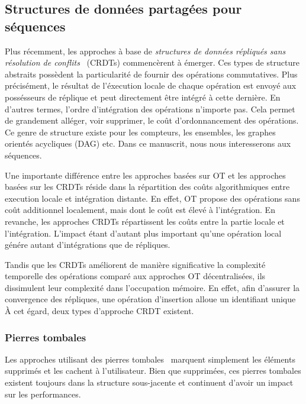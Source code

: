 \subsection{Structures de données partagées pour séquences}

Plus récemment, les approches à base de \emph{structures de données répliqués
  sans résolution de conflits}~\cite{shapiro2011comprehensive,
  shapiro2011conflict} (CRDTs) commencèrent à émerger. Ces types de structure
abstraits possèdent la particularité de fournir des opérations commutatives.
Plus précisément, le résultat de l'éxecution locale de chaque opération est
envoyé aux possésseurs de réplique et peut directement être intégré à cette
dernière.  En d'autres termes, l'ordre d'intégration des opérations n'importe
pas. Cela permet de grandement alléger, voir supprimer, le coût d'ordonnancement
des opérations. Ce genre de structure existe pour les compteurs, les ensembles,
les graphes orientés acycliques (DAG) etc. Dans ce manuscrit, nous nous
interesserons aux séquences.

Une importante différence entre les approches basées sur OT et les approches
basées sur les CRDTs réside dans la répartition des coûts algorithmiques entre
execution locale et intégration distante. En effet, OT propose des opérations
sans coût additionnel localement, mais dont le coût est élevé à l'intégration.
En revanche, les approches CRDTs répartissent les coûts entre la partie locale
et l'intégration.  L'impact étant d'autant plus important qu'une opération local
génére autant d'intégrations que de répliques.

Tandis que les CRDTs améliorent de manière significative la complexité
temporelle des opérations comparé aux approches OT décentralisées, ils
dissimulent leur complexité dans l'occupation mémoire. En effet, afin d'assurer
la convergence des répliques, une opération d'insertion alloue un identifiant
unique  À cet égard, deux types d'approche CRDT existent.

\subsubsection{Pierres tombales}

Les approches utilisant des pierres tombales~\cite{ahmed2011evaluating,
  conway2014language, grishchenko2010deep, oster2006data,
  preguica2009commutative, roh2011replicated, weiss2007wooki, wu2010partial,
  Yu2012stringwise} marquent simplement les éléments supprimés et les cachent à
l'utilisateur. Bien que supprimées, ces pierres tombales existent toujours dans
la structure sous-jacente et continuent d'avoir un impact sur les performances.

